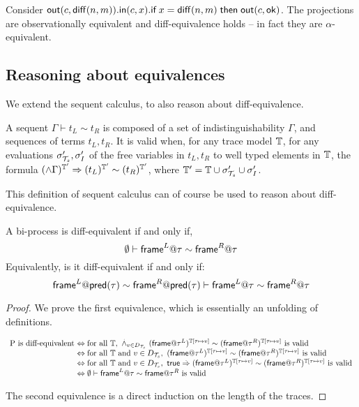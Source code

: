 \begin{example} \label{ex:problem}
  Consider $\mathsf{out}(c,\mathsf{diff}(n,m)).
  \mathsf{in}(c,x).
  \textsf{if}\; x=\mathsf{diff}(n,m) \;\textsf{then}\; \mathsf{out}(c,\mathsf{ok})$.
  The projections are observationally equivalent and diff-equivalence
  holds -- in fact they are $\alpha$-equivalent.
\end{example}


\subsection{Reasoning about equivalences}

We extend the sequent calculus, to also reason about diff-equivalence.

\begin{definition}
  A sequent $\Gamma \vdash t_L \sim t_R $ is composed of a set of indistinguishability $\Gamma$, and sequences of terms $t_L,t_R$.
  It is valid when, for any trace model $\mathbb{T}$, for any evaluations $\sigma_{\mathcal{T}_s}',\sigma_I'$ of the free variables in $t_L,t_R$ to well typed elements in $\mathbb{T}$, the formula $ (\wedge \Gamma)^{\mathbb{T}'} \Rightarrow (t_L)^{\mathbb{T}'} \sim  (t_R)^{\mathbb{T}'}$, where $\mathbb{T}'=\mathbb{T} \cup \sigma_{\mathcal{T}_s}'\cup \sigma_I'$.
\end{definition}

This definition of sequent calculus can of course be used to reason about diff-equivalence.
\begin{lemma}
  A bi-process is diff-equivalent if and only if,
  \[ \emptyset \vdash  \textsf{frame}^L@\tau \sim \textsf{frame}^R@\tau\]
  Equivalently, is it diff-equivalent if and only if:
  \[\textsf{frame}^L@\textsf{pred}(\tau) \sim \textsf{frame}^R@\textsf{pred}(\tau) \vdash \textsf{frame}^L@\tau \sim \textsf{frame}^R@\tau\]
\end{lemma}
\begin{proof}We prove the first equivalence, which is essentially an unfolding of definitions.

  \[
    \begin{array}{l@{~}l}
      $P$\text{ is diff-equivalent} & \Leftrightarrow \text{for all } \TM,\ \stackrel{.}{\wedge}_{v\in D_\XT} (\mframe@\tau^L)^{\TM[\tau\mapsto v]} \sim (\mframe@\tau^R)^{\TM[\tau \mapsto v]}\text{ is valid}\\
      & \Leftrightarrow \text{for all } \TM\text{ and } v\in D_\XT,\ (\mframe@\tau^L)^{\TM[\tau\mapsto v]} \sim (\mframe@\tau^R)^{\TM[\tau \mapsto v]}\text{ is valid}\\
      & \Leftrightarrow \text{for all } \TM\text{ and } v\in D_\XT,\ \true \stackrel{.}{\Rightarrow} (\mframe@\tau^L)^{\TM[\tau\mapsto v]} \sim (\mframe@\tau^R)^{\TM[\tau \mapsto v]}\text{ is valid}\\
      & \Leftrightarrow  \emptyset \vdash  \mframe^L@\tau \sim \mframe@\tau^R\text{ is valid}\\

    \end{array}
  \]

  The second equivalence is a direct induction on the length of the traces.
\end{proof}

